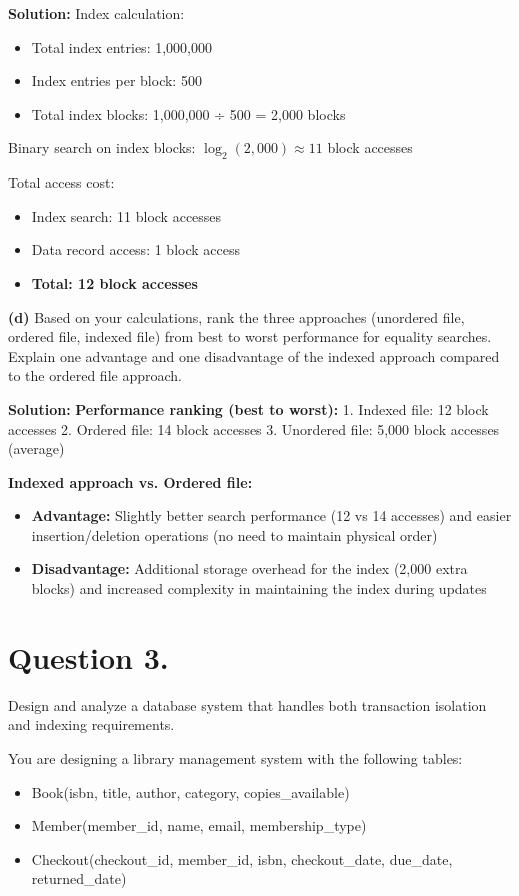 \documentclass{article}
\begin{document}
\textbf{Solution:}
Index calculation:
\begin{itemize}
    \item Total index entries: 1,000,000
    \item Index entries per block: 500
    \item Total index blocks: 1,000,000 ÷ 500 = 2,000 blocks
\end{itemize}

Binary search on index blocks: $\log_2(2,000) \approx 11$ block accesses

Total access cost:
\begin{itemize}
    \item Index search: 11 block accesses
    \item Data record access: 1 block access
    \item \textbf{Total: 12 block accesses}
\end{itemize}

\textbf{(d)} Based on your calculations, rank the three approaches (unordered file, ordered file, indexed file) from best to worst performance for equality searches. Explain one advantage and one disadvantage of the indexed approach compared to the ordered file approach.

\textbf{Solution:}
\textbf{Performance ranking (best to worst):}
1. Indexed file: 12 block accesses
2. Ordered file: 14 block accesses  
3. Unordered file: 5,000 block accesses (average)

\textbf{Indexed approach vs. Ordered file:}
\begin{itemize}
    \item \textbf{Advantage:} Slightly better search performance (12 vs 14 accesses) and easier insertion/deletion operations (no need to maintain physical order)
    \item \textbf{Disadvantage:} Additional storage overhead for the index (2,000 extra blocks) and increased complexity in maintaining the index during updates
\end{itemize}


\newpage
\section*{Question 3.}
Design and analyze a database system that handles both transaction isolation and indexing requirements.

You are designing a library management system with the following tables:
\begin{itemize}
    \item Book(isbn, title, author, category, copies\_available)
    \item Member(member\_id, name, email, membership\_type)
    \item Checkout(checkout\_id, member\_id, isbn, checkout\_date, due\_date, returned\_date)
\end{itemize}
\end{document}
